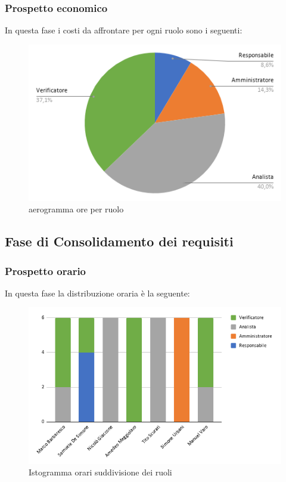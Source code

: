    \subsubsection{Prospetto economico}
    In questa fase i costi da affrontare per ogni ruolo sono i seguenti:

    \begin{figure}[!h]
        \caption{aerogramma ore per ruolo}
        \vspace{5px}
        \includegraphics[scale=0.5]{../../../Images/Diagrammi/Diagramma a torta/ore analisi.png}
        \centering
    \end{figure}

    \pagebreak
\subsection{Fase di Consolidamento dei requisiti}
    \subsubsection{Prospetto orario}
    In questa fase la distribuzione oraria è la seguente:
    \begin{figure}[!h]
        \caption{Istogramma orari suddivisione dei ruoli}
        \vspace{5px}
        \includegraphics[scale=0.6]{../../../Images/Diagrammi/Istogrammi/ore requisiti.png}
        \centering
    \end{figure}
